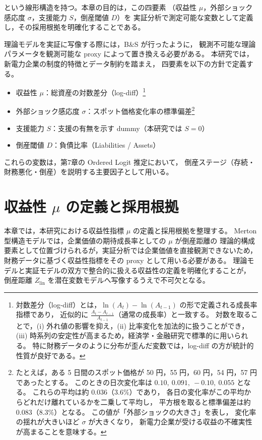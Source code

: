 という線形構造を持つ。本章の目的は，この四要素
（収益性 $\mu$，外部ショック感応度 $\sigma$，支援能力 $S$，倒産閾値 $D$）を
実証分析で測定可能な変数として定義し，その採用根拠を明確化することである。

理論モデルを実証に写像する際には，B\&S が行ったように，
観測不可能な理論パラメータを観測可能な proxy によって置き換える必要がある。
本研究では，新電力企業の制度的特徴とデータ制約を踏まえ，
四要素を以下の方針で定義する。

\begin{itemize}
    \item 収益性 $\mu$：総資産の対数差分（log-diff）\footnote{
対数差分（log-diff）とは，$\ln(A_t)-\ln(A_{t-1})$ の形で定義される成長率指標であり，
近似的に $\frac{A_t-A_{t-1}}{A_{t-1}}$（通常の成長率）と一致する。
対数を取ることで，(i) 外れ値の影響を抑え，(ii) 比率変化を加法的に扱うことができ，
(iii) 時系列の安定性が高まるため，経済学・金融研究で標準的に用いられる。
特に財務データのように分布が歪んだ変数では，log-diff の方が統計的性質が良好である。
}
    \item 外部ショック感応度 $\sigma$：スポット価格変化率の標準偏差\footnote{
たとえば，ある 5 日間のスポット価格が
50 円，55 円，60 円，54 円，57 円であったとする。
このときの日次変化率は
$0.10,\ 0.091,\ -0.10,\ 0.055$ となる。
これらの平均は約 $0.036$（3.6\%）であり，
各日の変化率がこの平均からどれだけ離れているかを二乗して平均し，
平方根を取ると標準偏差は約 $0.083$（8.3\%）となる。
この値が「外部ショックの大きさ」を表し，
変化率の揺れが大きいほど $\sigma$ が大きくなり，
新電力企業が受ける収益の不確実性が高まることを意味する。
}
    \item 支援能力 $S$：支援の有無を示す dummy（本研究では $S=0$）
    \item 倒産閾値 $D$：負債比率（Liabilities / Assets）
\end{itemize}

これらの変数は，第7章の Ordered Logit 推定において，
倒産ステージ（存続・財務悪化・倒産）を説明する主要因子として用いる。

\section{収益性 $\mu$ の定義と採用根拠}

本章では，本研究における収益性指標 $\mu$ の定義と採用根拠を整理する。
Merton 型構造モデルでは，企業価値の期待成長率としての $\mu$ が倒産距離の
理論的構成要素として位置づけられるが，実証分析では企業価値を直接観測できないため，
財務データに基づく収益性指標をその proxy として用いる必要がある。
理論モデルと実証モデルの双方で整合的に扱える収益性の定義を明確化することが，
倒産距離 $Z_{\text{lin}}$ を潜在変数モデルへ写像するうえで不可欠となる。

